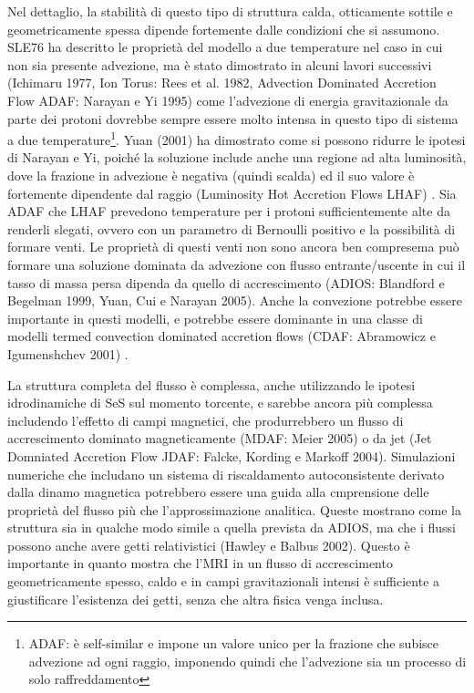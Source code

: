\documentclass[a4paperbi]{article}
\begin{document}
	Nel dettaglio, la stabilità di questo tipo di struttura calda, otticamente sottile e geometricamente spessa dipende fortemente dalle condizioni che si assumono. SLE76 ha descritto le proprietà del modello a due temperature nel caso in cui non sia presente advezione, ma è stato dimostrato in alcuni lavori successivi (Ichimaru 1977, Ion Torus: Rees et al. 1982, Advection Dominated Accretion Flow ADAF: Narayan e Yi 1995) come l'advezione di energia gravitazionale da parte dei protoni dovrebbe sempre essere molto intensa in questo tipo di sistema a due temperature\footnote{ADAF: è self-similar e impone un valore unico per la frazione che subisce advezione ad ogni raggio, imponendo quindi che l'advezione sia un processo di solo raffreddamento}.
	Yuan (2001) ha dimostrato come si possono ridurre le ipotesi di Narayan e Yi, poiché la soluzione include anche una regione ad alta luminosità, dove la frazione in advezione è negativa (quindi scalda) ed il suo valore è fortemente dipendente dal raggio (Luminosity Hot Accretion Flows LHAF) . Sia ADAF che LHAF prevedono temperature per i protoni sufficientemente alte da renderli slegati, ovvero con un parametro di Bernoulli positivo e la possibilità di formare venti. Le proprietà di questi venti non sono ancora ben compresema può formare una soluzione dominata da advezione con flusso entrante/uscente in cui il tasso di massa persa dipenda da quello di accrescimento (ADIOS: Blandford e Begelman 1999, Yuan, Cui e Narayan 2005). Anche la convezione potrebbe essere importante in questi modelli, e potrebbe essere dominante in una classe di modelli termed convection dominated accretion flows (CDAF: Abramowicz e Igumenshchev 2001) .
	
	La struttura completa del flusso è complessa, anche utilizzando le ipotesi idrodinamiche di SeS sul momento torcente, e sarebbe ancora più complessa includendo l'effetto di campi magnetici, che produrrebbero un flusso di accrescimento dominato magneticamente (MDAF: Meier 2005) o da jet (Jet Domniated Accretion Flow JDAF: Falcke, Kording e Markoff 2004). Simulazioni numeriche che includano un sistema di riscaldamento autoconsistente derivato dalla dinamo magnetica potrebbero essere una guida alla cmprensione delle proprietà del flusso più che l'approssimazione analitica. Queste mostrano come la struttura sia in qualche modo simile a quella prevista da ADIOS, ma che i flussi possono anche avere getti relativistici (Hawley e Balbus 2002). Questo è importante in quanto mostra che l'MRI in un flusso di accrescimento geometricamente spesso, caldo e in campi gravitazionali intensi è sufficiente a giustificare l'esistenza dei getti, senza che altra fisica venga inclusa.
	
\end{document}
